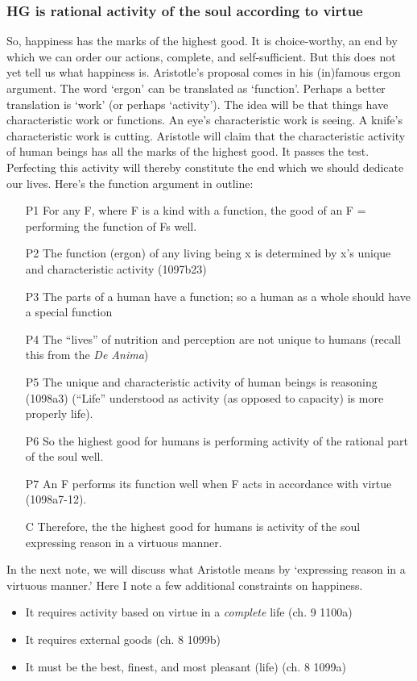 \documentclass[oneside]{article}
\begin{document}
\subsubsection*{HG is rational activity of the soul according to virtue}

So, happiness has the marks of the highest good. It is choice-worthy, an end by which we can order our actions, complete, and self-sufficient. But this does not yet tell us what happiness is. Aristotle's proposal comes in his (in)famous ergon argument. The word `ergon' can be translated as `function'. Perhaps a better translation is `work' (or perhaps `activity'). The idea will be that things have characteristic work or functions. An eye's characteristic work is seeing. A knife's characteristic work is cutting. Aristotle will claim that the characteristic activity of human beings has all the marks of the highest good. It passes the test. Perfecting this activity will thereby constitute the end which we should dedicate our lives. Here's the function argument in outline: 

\begin{enumerate}
\item[P1] For any F, where F is a kind with a function, the good of an F = performing the function of Fs well.
\item[P2] The function (ergon) of any living being x is determined by x's unique and  characteristic activity (1097b23)
\item[P3] The parts of a human have a function; so a human as a whole should have a special function
\item[P4] The ``lives'' of nutrition and perception are not unique to humans (recall this from the \emph{De Anima})
\item[P5] The unique and characteristic activity of human beings is reasoning (1098a3) (``Life'' understood as activity (as opposed to capacity) is more properly life).
\item[P6] So the highest good for humans is performing activity of the rational part of the soul well.
\item[P7] An F performs its function well when F acts in accordance with virtue (1098a7-12).
\item[C] Therefore, the the highest good for humans is activity of the soul expressing reason in a virtuous manner.  
\end{enumerate}
In the next note, we will discuss what Aristotle means by `expressing reason in a virtuous manner.' Here I note a few additional constraints on happiness.\begin{itemize}
\item It requires activity based on virtue in a \emph{complete} life (ch. 9 1100a)
\item It requires external goods (ch. 8 1099b)
\item It must be the best, finest, and most pleasant (life) (ch. 8 1099a)
\end{itemize}
\end{document}
